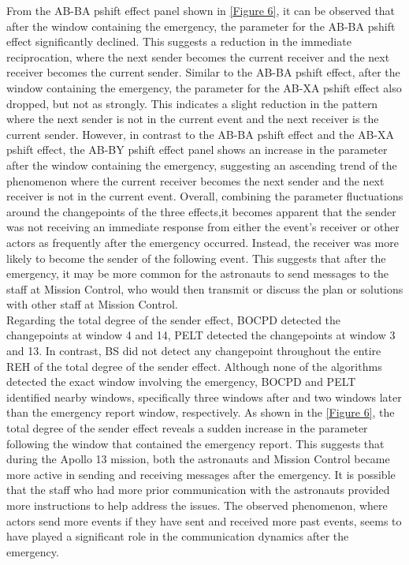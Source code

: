 \documentclass[]{interact}
\theoremstyle{plain}%
\theoremstyle{definition}
\theoremstyle{remark}
\begin{document}
{	From the AB-BA pshift effect panel shown in \autoref{Figure 6}, it can be observed that after the window containing the emergency, the parameter for the AB-BA pshift effect significantly declined. This suggests a reduction in the immediate reciprocation, where the next sender becomes the current receiver and the next receiver becomes the current sender. Similar to the AB-BA pshift effect, after the window containing the emergency, the parameter for the AB-XA pshift effect also dropped, but not as strongly. This indicates a slight reduction in the pattern where the next sender is not in the current event and the next receiver is the current sender. However, in contrast to the AB-BA pshift effect and the AB-XA pshift effect, the AB-BY pshift effect panel shows an increase in the parameter after the window containing the emergency, suggesting an ascending trend of the phenomenon where the current receiver becomes the next sender and the next receiver is not in the current event. Overall, combining the parameter fluctuations around the changepoints of the three effects,it becomes apparent that the sender was not receiving an immediate response from either the event's receiver or other actors as frequently after the emergency occurred. Instead, the receiver was more likely to become the sender of the following event. This suggests that after the emergency, it may be more common for the astronauts to send messages to the staff at Mission Control, who would then transmit or discuss the plan or solutions with other staff at Mission Control. \\
	  
	Regarding the total degree of the sender effect, BOCPD detected the changepoints at window 4 and 14, PELT detected the changepoints at window 3 and 13. In contrast, BS did not detect any changepoint throughout the entire REH of the total degree of the sender effect. Although none of the algorithms detected the exact window involving the emergency, BOCPD and PELT identified nearby windows, specifically three windows after and two windows later than the emergency report window, respectively. As shown in the \autoref{Figure 6}, the total degree of the sender effect reveals a sudden increase in the parameter following the window that contained the emergency report. This suggests that during the Apollo 13 mission, both the astronauts and Mission Control became more active in sending and receiving messages after the emergency. It is possible that the staff who had more prior communication with the astronauts provided more instructions to help address the issues. The observed phenomenon, where actors send more events if they have sent and received more past events, seems to have played a significant role in the communication dynamics after the emergency.\\
	
}
\end{document}
